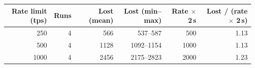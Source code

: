 \begin{tabular}{rrrrrr}
\toprule
Rate limit (tps) & Runs & Lost (mean) & Lost (min--max) & Rate $\times$ 2\,s & Lost / (rate $\times$ 2\,s) \\
\midrule
250 & 4 & 566 & 537--587 & 500 & 1.13 \\
500 & 4 & 1128 & 1092--1154 & 1000 & 1.13 \\
1000 & 4 & 2456 & 2175--2823 & 2000 & 1.23 \\
\bottomrule
\end{tabular}
